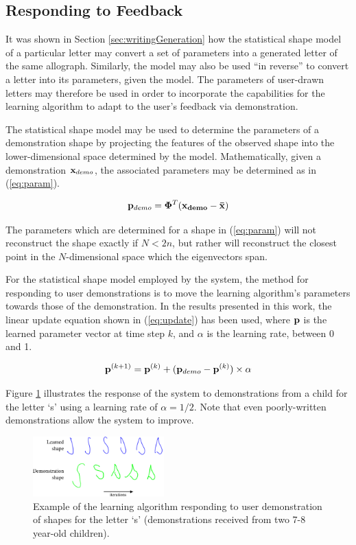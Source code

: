 \documentclass{sig-alternate}
\begin{document}
\subsection{Responding to Feedback}

It was shown in Section \ref{sec:writingGeneration} how the statistical shape
model of a particular letter may convert a set of parameters into a generated
letter of the same allograph. Similarly, the model may also be used ``in reverse'' 
to convert a
letter into its parameters, given the model. The parameters of user-drawn
letters may therefore be used in order to incorporate the capabilities for the
learning algorithm to adapt to the user's feedback via demonstration.

The statistical shape model may be used to determine the parameters of a
demonstration shape by projecting the features of the observed shape into the
lower-dimensional space determined by the model. Mathematically, given a
demonstration ${\bf x}_{demo}$, the associated parameters may be determined as in
(\ref{eq:param}).

\begin{equation}\label{eq:param}
{\bf p}_{demo} ={\bf \Phi}^T ({\bf{x}_{demo}}-\bf{\bar{x}})
\end{equation}

The parameters which are determined for a shape in (\ref{eq:param}) will not
reconstruct the shape exactly if $N<2n$, but rather will reconstruct the closest
point in the $N$-dimensional space which the eigenvectors span.

For the statistical shape model employed by the system, the method for
responding to user demonstrations is to move the learning algorithm's parameters
towards those of the demonstration. In the results presented in this work, the
linear update equation shown in (\ref{eq:update}) has been used, where ${\bf p}$ is the
learned parameter vector at time step $k$, and $\alpha$ is the learning rate,
between 0 and 1.  

\begin{equation}\label{eq:update}
{\bf p}^{(k+1)} = {\bf p}^{(k)} + ({\bf p}_{demo}-{\bf
p}^{(k)})\times\alpha
\end{equation}

Figure \ref{fig:demonstrationShapes2} illustrates the response of the system to
demonstrations from a child for the letter `s' using a learning rate of
$\alpha=1/2$.  Note that even poorly-written demonstrations allow the system to improve.

\begin{figure}[thpb]
    \centering
    \includegraphics[width=0.45\textwidth]{figures/learningSdemo}
    \caption{\label{fig:demonstrationShapes2}Example of the learning algorithm
    responding to user demonstration of shapes for the letter `s' (demonstrations received from two 7-8 year-old children).}
\end{figure}
\end{document}
